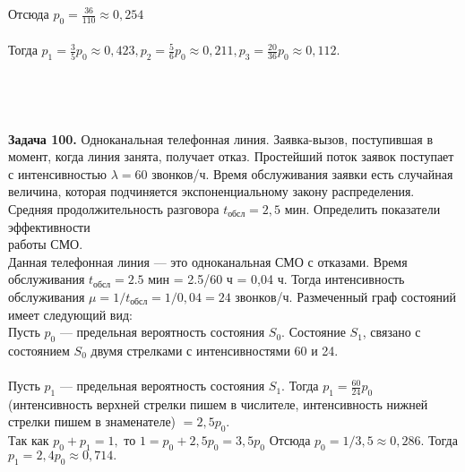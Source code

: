 \documentclass{article}
\begin{document}
\noindent Отсюда $p_0 = \frac{36}{110} \approx 0,254$
\\ \\  \indent Тогда $p_1 = \frac{3}{5}p_0 \approx
0,423, p_2 = \frac{5}{6}p_0 \approx 0,211, p_3 = \frac{20}{36}p_0 \approx 0,112$.
\\ \\ 
\\ \\ \\
\textbf{Задача  100.} Одноканальная телефонная линия. Заявка-вызов, поступившая в момент, когда линия занята, получает отказ. Простейший  поток  заявок  поступает  с  интенсивностью $\lambda = 60 $ звонков/ч. Время обслуживания заявки есть случайная величина, которая подчиняется  экспоненциальному  закону  распределения.  Средняя  продолжительность разговора $t_{\text{обсл}} = 2,5$ мин. Определить показатели эффективности \\работы СМО. \\ \indent Данная телефонная линия — это одноканальная СМО с отказами. Время обслуживания $t_{\text{обсл}} = 2.5$ мин = 2.5/60 ч = 0,04 ч. Тогда интенсивность обслуживания $\mu = 1/t_{\text{обсл}} = 1/0,04 = 24$ звонков/ч. Размеченный граф состояний имеет следующий вид:
\\
\indent Пусть $p_0$  —  предельная  вероятность состояния $S_0$.  Состояние  $S_1$, связано с состоянием $S_0$ двумя стрелками с интенсивностями 60 и 24. \\ \\ \noindent
Пусть $p_1$  —  предельная  вероятность  состояния  $S_1$.  Тогда $p_1 = \frac{60}{24}p_0$ (интенсивность верхней стрелки пишем в числителе, интенсивность нижней стрелки пишем в знаменателе) $= 2,5p_0$. \\ \indent
Так как $p_0 + p_1 = 1,$ то  $1 = p_0 + 2,5p_0 = 3,5p_0$  Отсюда $p_0 = 1/3,5 \approx 0,286.$ Тогда $p_1 = 2,4p_0 \approx 0,714.$ \\ \indent
\end{document}
